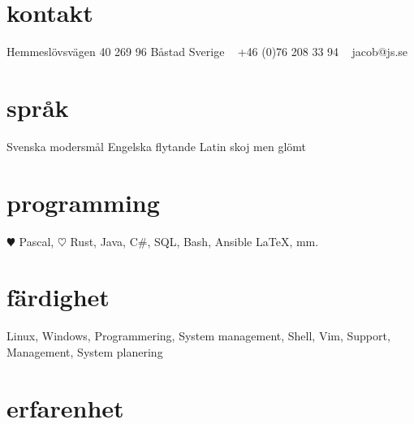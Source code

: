 \documentclass[]{cv-style}          %
\begin{document}
\lastupdated


\begin{aside}
%
\section{kontakt}
Hemmeslövsvägen 40
269 96 Båstad
Sverige
~
+46 (0)76 208 33 94
~
jacob@js.se
%
\section{språk}
Svenska modersmål
Engelska flytande
Latin skoj men glömt
%
\section{programming}
{\color{red} $\varheartsuit$} Pascal, {\color{red} $\heartsuit$} Rust, Java, C\#, SQL, Bash, {\color{orange} }Ansible
\LaTeX{}, mm.
%
\end{aside}


\section{färdighet}
  \vspace{-0.2cm}

  Linux, Windows, Programmering, System management, Shell, Vim, Support, Management, System planering

\section{erfarenhet}
\end{document}

